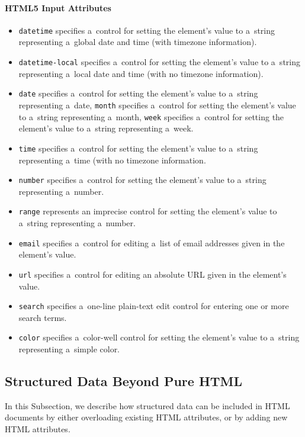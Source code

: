 \paragraph{HTML5 Input Attributes}
\begin{itemize}
\item \texttt{datetime} specifies a~control for setting the element’s value
to a~string representing a~global date and time (with timezone information).
\item \texttt{datetime-local} specifies a~control for setting the element’s value
to a~string representing a~local date and time (with no timezone information).
\item \texttt{date} specifies a~control for setting the element’s value
to a~string representing a~date, \texttt{month} specifies a~control
for setting the element’s value to a~string
representing a~month, \texttt{week} specifies a~control for setting the element’s value
to a~string representing a~week.
\item \texttt{time} specifies a~control for setting the element’s value
to a~string representing a~time (with no timezone information.
\item \texttt{number} specifies a~control for setting the element’s value
to a~string representing a~number.
\item \texttt{range}  represents an imprecise control for setting the element’s value
to a~string representing a~number.
\item \texttt{email} specifies a~control for editing a~list of email addresses
given in the element’s value.
\item \texttt{url} specifies a~control for editing an absolute URL
given in the element’s value.
\item \texttt{search} specifies a~one-line plain-text edit control
for entering one or more search terms.
\item \texttt{color} specifies a~color-well control for setting the element’s value
to a~string representing a~simple color.
\end{itemize}

\subsection{Structured Data Beyond Pure HTML}
In this Subsection, we describe how structured data can be included in HTML documents
by either overloading existing HTML attributes, or by adding new HTML attributes.

